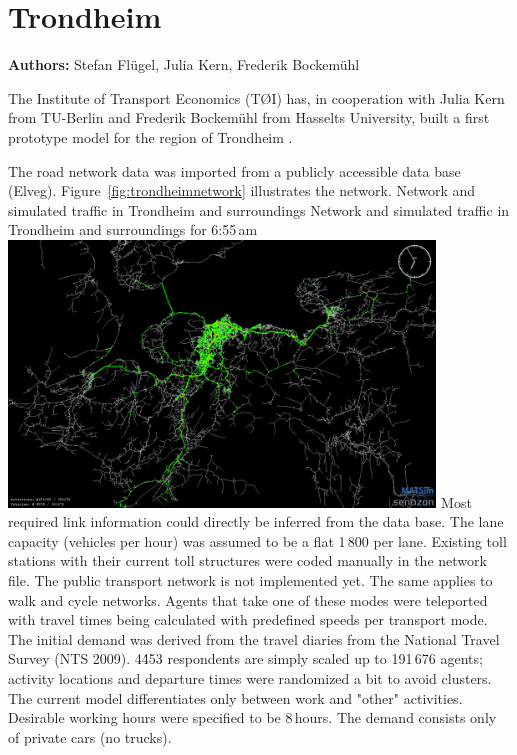 \section{Trondheim}
\label{sec:trondheim}
\hfill \textbf{Authors:} Stefan Flügel, Julia Kern, Frederik Bockemühl

The Institute of Transport Economics (TØI) has, in cooperation with Julia Kern from TU-Berlin and Frederik Bockemühl from Hasselts University, built a first prototype model for the region of Trondheim \citep[][]{FluegelKern_unpub_WTS_2014}.

The road network data was imported from a publicly accessible data base (Elveg). Figure~\ref{fig:trondheimnetwork} illustrates the network. 
%
\createfigure%
{Network and simulated traffic in Trondheim and surroundings}%
{Network and simulated traffic in Trondheim and surroundings for 6:55\,am \citep[source][]{FluegelEtAl_Samferdsel_2014}}%
{\label{fig:trondheimnetwork}}%
{\includegraphics[width=0.85\textwidth, angle=0]{./using/figures/trondheimnetwork.png}}%
{}
%
Most required link information could directly be inferred from the data base. The lane capacity (vehicles per hour) was assumed to be a flat 1\,800 per lane. Existing toll stations with their current toll structures were coded manually in the network file. The public transport network is not implemented yet. The same applies to walk and cycle networks. Agents that take one of these modes were \gls{teleported} with travel times being calculated with predefined speeds per transport mode. 
The initial demand was derived from the travel diaries from the National Travel Survey (NTS 2009). 4\'453 respondents are simply scaled up to 191\,676 agents; activity locations and departure times were randomized a bit to avoid clusters. The current model differentiates only between work and "other" activities. Desirable working hours were specified to be 8\,hours. The demand consists only of private cars (no trucks). 

